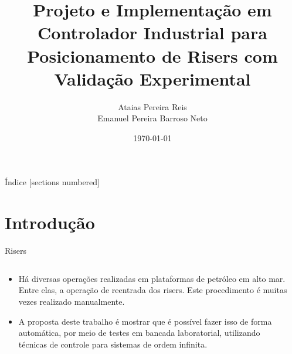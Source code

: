 \documentclass[10pt]{beamer}
\title{Projeto e Implementação em Controlador Industrial para Posicionamento de Risers com Validação Experimental}
\date{\today}
\author{Ataias Pereira Reis\\ Emanuel Pereira Barroso Neto}
\institute{Faculdade de Tecnologia\\ Universidade de Brasília}
\begin{document}
\maketitle

\begin{frame}{Índice}
  [sections numbered]
  \tableofcontents[hideallsubsections]
\end{frame}

\section{Introdução}

\begin{frame}[fragile]{Risers}

\begin{columns}[T] %
\begin{column}{.5\textwidth}

\begin{block}{}
\begin{itemize}
\item Há diversas operações realizadas em plataformas de petróleo em alto mar. Entre elas, a operação de reentrada dos risers. Este procedimento é muitas vezes realizado manualmente. \item A proposta deste trabalho é mostrar que é possível fazer isso de forma automática, por meio de testes em bancada laboratorial, utilizando técnicas de controle para sistemas de ordem infinita.
\end{itemize}\end{block}

\end{column}%
\hfill%
\begin{column}{.5\textwidth}


\end{column}
\end{columns}
\end{frame}
\end{document}
